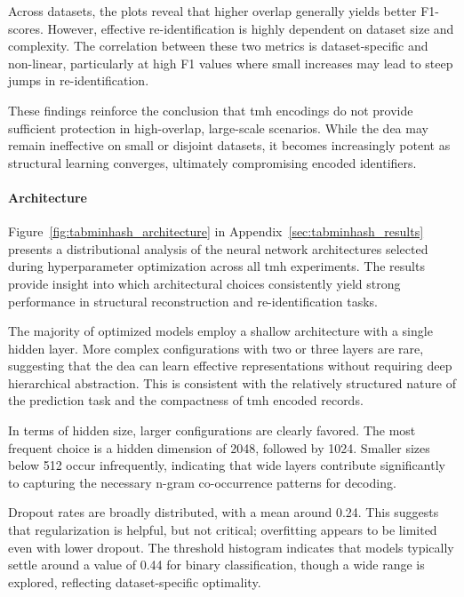 Across datasets, the plots reveal that higher overlap generally yields better F1-scores.
However, effective re-identification is highly dependent on dataset size and complexity.
The correlation between these two metrics is dataset-specific and non-linear, particularly at high F1 values where small increases may lead to steep jumps in re-identification.

These findings reinforce the conclusion that \ac{tmh} encodings do not provide sufficient protection in high-overlap, large-scale scenarios.
While the \ac{dea} may remain ineffective on small or disjoint datasets, it becomes increasingly potent as structural learning converges, ultimately compromising encoded identifiers.

\paragraph{Architecture}

Figure~\ref{fig:tabminhash_architecture} in Appendix~\ref{sec:tabminhash_results} presents a distributional analysis of the neural network architectures selected during hyperparameter optimization across all \ac{tmh} experiments.
The results provide insight into which architectural choices consistently yield strong performance in structural reconstruction and re-identification tasks.

The majority of optimized models employ a shallow architecture with a single hidden layer.
More complex configurations with two or three layers are rare, suggesting that the \ac{dea} can learn effective representations without requiring deep hierarchical abstraction.
This is consistent with the relatively structured nature of the prediction task and the compactness of \ac{tmh} encoded records.

In terms of hidden size, larger configurations are clearly favored.
The most frequent choice is a hidden dimension of 2048, followed by 1024.
Smaller sizes below 512 occur infrequently, indicating that wide layers contribute significantly to capturing the necessary n-gram co-occurrence patterns for decoding.

Dropout rates are broadly distributed, with a mean around 0.24.
This suggests that regularization is helpful, but not critical; overfitting appears to be limited even with lower dropout.
The threshold histogram indicates that models typically settle around a value of 0.44 for binary classification, though a wide range is explored, reflecting dataset-specific optimality.

